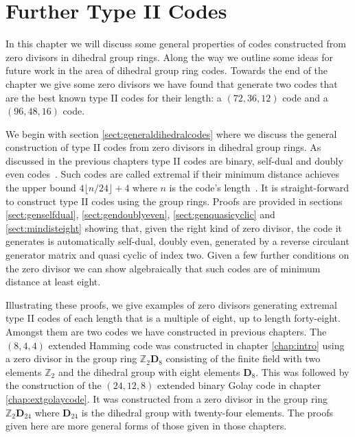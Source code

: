 \chapter{Further Type II Codes}
\label{chap:longer}
In this chapter we will discuss some general properties of codes constructed from zero divisors in dihedral group rings.
Along the way we outline some ideas for future work in the area of dihedral group ring codes.
Towards the end of the chapter we give some zero divisors we have found that generate two codes that are the best known type II codes for their length: a $(72,36,12)$ code and a $(96,48,16)$ code.

We begin with section \ref{sect:generaldihedralcodes} where we discuss the general construction of type II codes from zero divisors in dihedral group rings.
As discussed in the previous chapters type II codes are binary, self-dual and doubly even codes~\cite[p.~96]{han98a}.
Such codes are called extremal if their minimum distance achieves the upper bound $4 \lfloor n / 24 \rfloor + 4$ where $n$ is the code's length~\cite[p.~270]{han98a}.
It is straight-forward to construct type II codes using the group rings.
Proofs are provided in sections \ref{sect:genselfdual}, \ref{sect:gendoublyeven}, \ref{sect:genquasicyclic} and \ref{sect:mindisteight} showing that, given the right kind of zero divisor, the code it generates is automatically self-dual, doubly even, generated by a reverse circulant generator matrix and quasi cyclic of index two.
Given a few further conditions on the zero divisor we can show algebraically that such codes are of minimum distance at least eight.

Illustrating these proofs, we give examples of zero divisors generating extremal type II codes of each length that is a multiple of eight, up to length forty-eight.
Amongst them are two codes we have constructed in previous chapters.
The $(8,4,4)$ extended Hamming code was constructed in chapter \ref{chap:intro} using a zero divisor in the group ring $\mathbb{Z}_2 \mathbf{D}_{8}$ consisting of the finite field with two elements $\mathbb{Z}_2$ and the dihedral group with eight elements $\mathbf{D}_{8}$.
This was followed by the construction of the $(24,12,8)$ extended binary Golay code in chapter \ref{chap:extgolaycode}.
It was constructed from a zero divisor in the group ring $\mathbb{Z}_2 \mathbf{D}_{24}$ where $\mathbf{D}_{24}$ is the dihedral group with twenty-four elements.
The proofs given here are more general forms of those given in those chapters.

